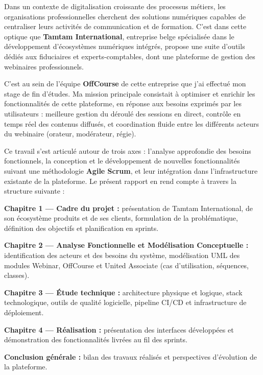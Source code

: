 \documentclass{rapportPFEHIND}
\begin{document}
Dans un contexte de digitalisation croissante des processus métiers, les organisations professionnelles cherchent des solutions numériques capables de centraliser leurs activités de communication et de formation. C'est dans cette optique que \textbf{Tamtam International}, entreprise belge spécialisée dans le développement d'écosystèmes numériques intégrés, propose une suite d'outils dédiés aux fiduciaires et experts-comptables, dont une plateforme de gestion des webinaires professionnels.

C'est au sein de l'équipe \textbf{OffCourse} de cette entreprise que j'ai effectué mon stage de fin d'études. Ma mission principale consistait à optimiser et enrichir les fonctionnalités de cette plateforme, en réponse aux besoins exprimés par les utilisateurs : meilleure gestion du déroulé des sessions en direct, contrôle en temps réel des contenus diffusés, et coordination fluide entre les différents acteurs du webinaire (orateur, modérateur, régie).

Ce travail s'est articulé autour de trois axes : l'analyse approfondie des besoins fonctionnels, la conception et le développement de nouvelles fonctionnalités suivant une méthodologie \textbf{Agile Scrum}, et leur intégration dans l'infrastructure existante de la plateforme. Le présent rapport en rend compte à travers la structure suivante :

\medskip
\textbf{Chapitre 1 --- Cadre du projet :} présentation de Tamtam International, de son écosystème produits et de ses clients, formulation de la problématique, définition des objectifs et planification en sprints.

\textbf{Chapitre 2 --- Analyse Fonctionnelle et Modélisation Conceptuelle :} identification des acteurs et des besoins du système, modélisation UML des modules Webinar, OffCourse et United Associate (cas d'utilisation, séquences, classes).

\textbf{Chapitre 3 --- Étude technique :} architecture physique et logique, stack technologique, outils de qualité logicielle, pipeline CI/CD et infrastructure de déploiement.

\textbf{Chapitre 4 --- Réalisation :} présentation des interfaces développées et démonstration des fonctionnalités livrées au fil des sprints.

\textbf{Conclusion générale :} bilan des travaux réalisés et perspectives d'évolution de la plateforme.





\end{document}
